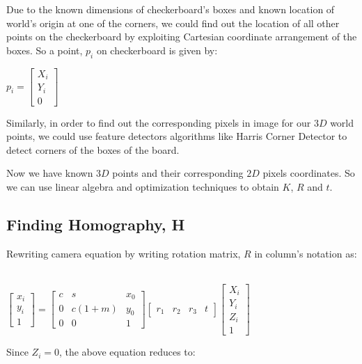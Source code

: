 \documentclass[a4paper]{article}
\begin{document}
Due to the known dimensions of checkerboard's boxes and known location of world's origin at one of the corners, we could find out the location of all other points on the checkerboard by exploiting Cartesian coordinate arrangement of the boxes. So a point, $p_{i}$ on checkerboard is given by: 

\begin{center}
    $p_{i} = \begin{bmatrix} X_{i} \\ Y_{i} \\ 0\end{bmatrix} $
\end{center}

Similarly, in order to find out the corresponding pixels in image for our $3D$ world points, we could use feature detectors algorithms like Harris Corner Detector to detect corners of the boxes of the board.  

Now we have known $3D$ points and their corresponding $2D$ pixels coordinates. So we can use linear algebra and optimization techniques to obtain $K$, $R$ and $t$. 

\subsection{Finding Homography, H}
Rewriting camera equation by writing rotation matrix, $R$ in column's notation as: 

\begin{center}
\\$ \begin{bmatrix} x_{i}\\ y_{i}\\ 1 \end{bmatrix}   =   \begin{bmatrix} c & s & x_{0}\\ 0 & c(1+m) & y_{0}\\ 0 & 0 & 1\end{bmatrix} \begin{bmatrix} r_{1} & r_{2} & r_{3} & t \end{bmatrix} \begin{bmatrix} X_{i}\\ Y_{i}\\ Z_{i} \\ 1  \end{bmatrix}$
\end{center}

Since $Z_{i} = 0$, the above equation reduces to:
\end{document}

